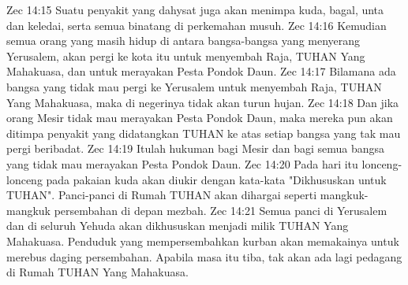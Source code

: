 Zec 14:15  Suatu penyakit yang dahysat juga akan menimpa kuda, bagal, unta dan keledai, serta semua binatang di perkemahan musuh.
Zec 14:16  Kemudian semua orang yang masih hidup di antara bangsa-bangsa yang menyerang Yerusalem, akan pergi ke kota itu untuk menyembah Raja, TUHAN Yang Mahakuasa, dan untuk merayakan Pesta Pondok Daun.
Zec 14:17  Bilamana ada bangsa yang tidak mau pergi ke Yerusalem untuk menyembah Raja, TUHAN Yang Mahakuasa, maka di negerinya tidak akan turun hujan.
Zec 14:18  Dan jika orang Mesir tidak mau merayakan Pesta Pondok Daun, maka mereka pun akan ditimpa penyakit yang didatangkan TUHAN ke atas setiap bangsa yang tak mau pergi beribadat.
Zec 14:19  Itulah hukuman bagi Mesir dan bagi semua bangsa yang tidak mau merayakan Pesta Pondok Daun.
Zec 14:20  Pada hari itu lonceng-lonceng pada pakaian kuda akan diukir dengan kata-kata "Dikhususkan untuk TUHAN". Panci-panci di Rumah TUHAN akan dihargai seperti mangkuk-mangkuk persembahan di depan mezbah.
Zec 14:21  Semua panci di Yerusalem dan di seluruh Yehuda akan dikhususkan menjadi milik TUHAN Yang Mahakuasa. Penduduk yang mempersembahkan kurban akan memakainya untuk merebus daging persembahan. Apabila masa itu tiba, tak akan ada lagi pedagang di Rumah TUHAN Yang Mahakuasa.


